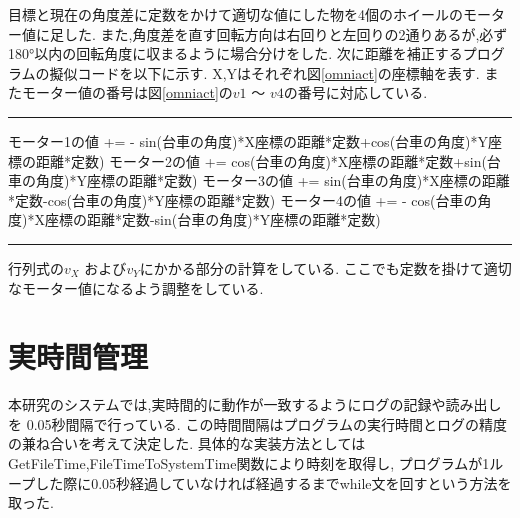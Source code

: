 目標と現在の角度差に定数をかけて適切な値にした物を4個のホイールのモーター値に足した.
また,角度差を直す回転方向は右回りと左回りの2通りあるが,必ず180°以内の回転角度に収まるように場合分けをした.
次に距離を補正するプログラムの擬似コードを以下に示す.
X,Yはそれぞれ図\ref{omniact}の座標軸を表す.
またモーター値の番号は図\ref{omniact}の$v1$ ～ $v4$の番号に対応している.

\vspace{4zh} 
\hrule width 15cm
\begin{verbatimtab}	
モーター1の値 += - sin(台車の角度)*X座標の距離*定数+cos(台車の角度)*Y座標の距離*定数)
モーター2の値 +=   cos(台車の角度)*X座標の距離*定数+sin(台車の角度)*Y座標の距離*定数)
モーター3の値 +=   sin(台車の角度)*X座標の距離*定数-cos(台車の角度)*Y座標の距離*定数)
モーター4の値 += - cos(台車の角度)*X座標の距離*定数-sin(台車の角度)*Y座標の距離*定数)
\end{verbatimtab}
\hrule width 15cm
\vspace{4zh}

行列式の$v_X$ および$v_Y$にかかる部分の計算をしている.
ここでも定数を掛けて適切なモーター値になるよう調整をしている.









\section{実時間管理}
本研究のシステムでは,実時間的に動作が一致するようにログの記録や読み出しを
0.05秒間隔で行っている.
この時間間隔はプログラムの実行時間とログの精度の兼ね合いを考えて決定した.
具体的な実装方法としてはGetFileTime,FileTimeToSystemTime関数により時刻を取得し,
プログラムが1ループした際に0.05秒経過していなければ経過するまでwhile文を回すという方法を取った.


